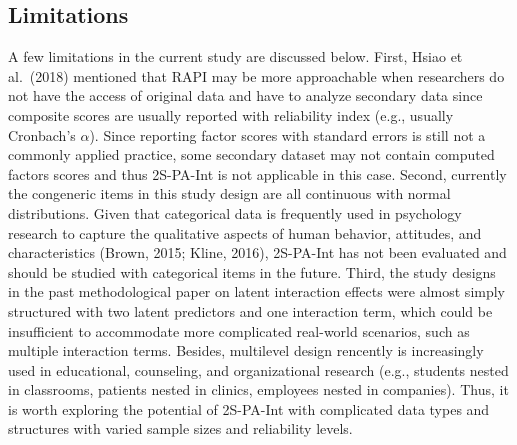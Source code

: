 \documentclass[
  man]{apa7}
\begin{document}
\hypertarget{limitations}{%
\subsection{Limitations}\label{limitations}}

A few limitations in the current study are discussed below. First, Hsiao et al.~(2018) mentioned that RAPI may be more approachable when researchers do not have the access of original data and have to analyze secondary data since composite scores are usually reported with reliability index (e.g., usually Cronbach's \(\alpha\)). Since reporting factor scores with standard errors is still not a commonly applied practice, some secondary dataset may not contain computed factors scores and thus 2S-PA-Int is not applicable in this case. Second, currently the congeneric items in this study design are all continuous with normal distributions. Given that categorical data is frequently used in psychology research to capture the qualitative aspects of human behavior, attitudes, and characteristics (Brown, 2015; Kline, 2016), 2S-PA-Int has not been evaluated and should be studied with categorical items in the future. Third, the study designs in the past methodological paper on latent interaction effects were almost simply structured with two latent predictors and one interaction term, which could be insufficient to accommodate more complicated real-world scenarios, such as multiple interaction terms. Besides, multilevel design rencently is increasingly used in educational, counseling, and organizational research (e.g., students nested in classrooms, patients nested in clinics, employees nested in companies). Thus, it is worth exploring the potential of 2S-PA-Int with complicated data types and structures with varied sample sizes and reliability levels.
\end{document}
